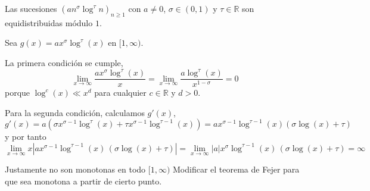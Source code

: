\begin{example}
    Las sucesiones $(an^\sigma\log^\tau n)_{n\geq1}$ con $a \neq 0$, 
    $\sigma \in (0,1)$ y $\tau \in \mathbb{R}$ son equidistribuidas módulo $1$.
\end{example}

\begin{resolve}
    Sea $g(x) = ax^\sigma\log^\tau (x)$ en $[1,\infty)$.
    
    La primera condición se cumple,
    \[
        \lim_{x \to \infty} \frac{ax^\sigma\log^\tau (x)}{x} = 
        \lim_{x \to \infty} \frac{a\log^\tau (x)}{x^{1-\sigma}} = 0
    \]
    porque $\log^c (x) \ll x^d$ para cualquier $c \in \mathbb{R}$ y $d > 0$.
    
    Para la segunda condición, calculamos $g'(x)$,
    \[
        g'(x) = 
        a \left(\sigma x^{\sigma-1} \log^\tau (x) + \tau x^{\sigma-1} \log^{\tau-1} (x)\right) =
        a x^{\sigma-1} \log^{\tau-1} (x) \left(\sigma \log (x) + \tau\right)
    \]
    y por tanto
    \[
        \lim_{x \to \infty} x |a x^{\sigma-1} \log^{\tau-1} (x) \, \left(\sigma \log (x) + \tau\right)| =
        \lim_{x \to \infty} |a| x^{\sigma} \log^{\tau-1} (x) \, \left(\sigma \log (x) + \tau\right) = \infty
    \]

    Justamente no son monotonas en todo $[1,\infty)$
    Modificar el teorema de Fejer para que sea monotona a partir de cierto punto.
\end{resolve}